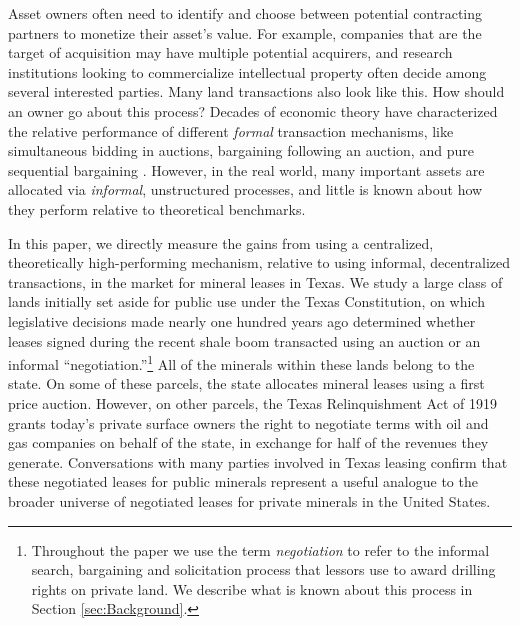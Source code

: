 \newpage

Asset owners often need to identify and choose between potential contracting partners to monetize their asset's value. For example, companies that are the target of acquisition may have multiple potential acquirers, and research institutions looking to commercialize intellectual property often decide among several interested parties. Many land transactions also look like this. How should an owner go about this process?  Decades of economic theory have characterized the relative performance of different \textit{formal} transaction mechanisms, like simultaneous bidding in auctions, bargaining following an auction, and pure sequential bargaining \citep{bulow_auctions_1996, bulow_why_2009, roberts_when_2013}.  However, in the real world, many important assets are allocated via \textit{informal}, unstructured processes, and little is known about how they perform relative to theoretical benchmarks.

In this paper, we directly measure the gains from using a centralized, theoretically high-performing mechanism, relative to using informal, decentralized transactions, in the market for mineral leases in Texas. We study a large class of lands initially set aside for public use under the Texas Constitution, on which legislative decisions made nearly one hundred years ago determined whether leases signed during the recent shale boom transacted using an auction or an informal ``negotiation.''\footnote{Throughout the paper we use the term \textit{negotiation} to refer to the informal search, bargaining and solicitation process that lessors use to award drilling rights on private land. We describe what is known about this process in Section \ref{sec:Background}.} All of the minerals within these lands belong to the state. On some of these parcels, the state allocates mineral leases using a first price auction. However, on other parcels, the Texas Relinquishment Act of 1919 grants today's private surface owners the right to negotiate terms with oil and gas companies on behalf of the state, in exchange for half of the revenues they generate.  Conversations with many parties involved in Texas leasing confirm that these negotiated leases for public minerals represent a useful analogue to the broader universe of negotiated leases for private minerals in the United States. 


